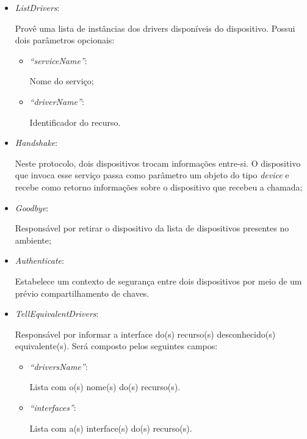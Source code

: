 \begin{itemize}
	\item \emph{ListDrivers}: 

		Provê uma lista de instâncias dos drivers disponíveis do dispositivo. Possui dois parâmetros opcionais:
		\begin{itemize}
			\item \emph{``serviceName''}: 

				Nome do serviço;
			\item \emph{``driverName''}: 

				Identificador do recurso.
		\end{itemize}
	\item \emph{Handshake}: 

		Neste protocolo, dois dispositivos trocam informações entre-si. O dispositivo que invoca esse serviço passa como parâmetro um objeto do tipo \emph{device} e recebe como retorno informações sobre o dispositivo que recebeu a chamada;
	\item \emph{Goodbye}: 

		Responsável por retirar o dispositivo da lista de dispositivos presentes no ambiente;
	\item \emph{Authenticate}: 

		Estabelece um contexto de segurança entre dois dispositivos por meio de um prévio compartilhamento de chaves.

	\item \emph{TellEquivalentDrivers}:

		Responsável por informar a interface do(s) recurso(s) desconhecido(s) equivalente(s). Será composto pelos seguintes campos:

		\begin{itemize}
			\item \emph{``driversName''}:

			Lista com o(s) nome(s) do(s) recurso(s).

			\item \emph{``interfaces''}:

			Lista com a(s) interface(s) do(s) recurso(s).
		\end{itemize}
\end{itemize}


\begin{comment}
Serão afetados, ainda, dois protocolos básicos, o \emph{Service Call} e o \emph{Notify}, e o serviço \emph{ListDrivers} dos protocolos \emph{Device Driver} e \emph{Register Driver}. Todos esses serviços contém o parâmetro \emph{driver} que passará a representar uma classe dentre as classes de recursos e não mais o nome do recurso simplesmente.
\end{comment}

